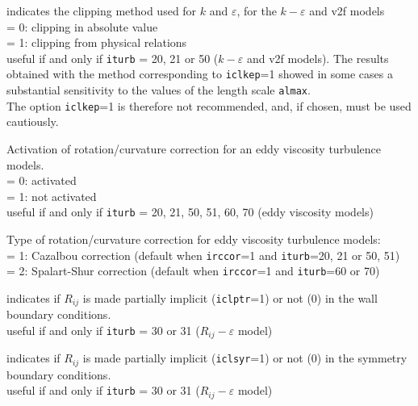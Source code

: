 {indicates the clipping method used for $k$ and
$\varepsilon$, for the $k-\varepsilon$ and v2f models\\
\hspace*{1.3cm}= 0: clipping in absolute value\\
\hspace*{1.3cm}= 1: clipping from physical relations\\
useful if and only if {\tt iturb} = 20, 21 or 50 ($k-\varepsilon$ and
v2f models). The results obtained with the method corresponding to
{\tt iclkep}=1 showed in some cases a substantial sensitivity to the
values of the length scale {\tt almax}.\\
The option {\tt iclkep}=1 is therefore not recommended, and,
if chosen, must be used cautiously.}

{Activation of rotation/curvature correction for an eddy viscosity turbulence models.\\
\hspace*{1.3cm}= 0: activated\\
\hspace*{1.3cm}= 1: not activated\\
useful if and only if {\tt iturb} = 20, 21, 50, 51, 60, 70 (eddy viscosity models)
}

{Type of rotation/curvature correction for eddy viscosity turbulence models:\\
\hspace*{1.3cm}= 1: Cazalbou correction (default when {\tt irccor}=1 and {\tt iturb}=20, 21 or 50, 51)\\
\hspace*{1.3cm}= 2: Spalart-Shur correction (default when {\tt irccor}=1 and {\tt iturb}=60 or 70)
}


{indicates if $R_{ij}$ is made partially implicit
({\tt iclptr}=1) or not (0) in the wall boundary conditions.\\
useful if and only if {\tt iturb} = 30 or 31 ($R_{ij}-\varepsilon$ model)}

{indicates if $R_{ij}$ is made partially implicit
({\tt iclsyr}=1) or not (0) in the symmetry boundary conditions.\\
useful if and only if {\tt iturb} = 30 or 31 ($R_{ij}-\varepsilon$ model)}

